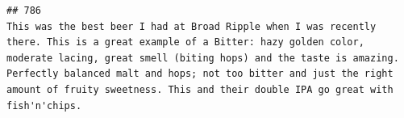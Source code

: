\documentclass[
  a4paper,
]{article}
\begin{document}
\begin{verbatim}
## 786                                                                                                                                                                                                                                                                                                                                                                                                                                                                                                                                                                                                                                                                                                                                                                                                                                                                                                                                                                                                                                                                                                                                                                                                                                                                                                                                                                                                                 This was the best beer I had at Broad Ripple when I was recently there. This is a great example of a Bitter: hazy golden color, moderate lacing, great smell (biting hops) and the taste is amazing. Perfectly balanced malt and hops; not too bitter and just the right amount of fruity sweetness. This and their double IPA go great with fish'n'chips.

\end{verbatim}
\end{document}
